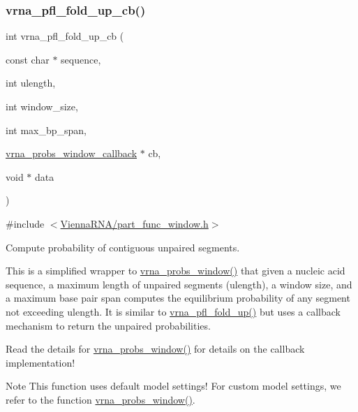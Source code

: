 \subsubsection{\texorpdfstring{vrna\+\_\+pfl\+\_\+fold\+\_\+up\+\_\+cb()}{vrna\_pfl\_fold\_up\_cb()}}
{\footnotesize\ttfamily int vrna\+\_\+pfl\+\_\+fold\+\_\+up\+\_\+cb (\begin{DoxyParamCaption}\item[{const char $\ast$}]{sequence,  }\item[{int}]{ulength,  }\item[{int}]{window\+\_\+size,  }\item[{int}]{max\+\_\+bp\+\_\+span,  }\item[{\hyperlink{group__part__func__window_gabe710a1182e6db69cc75329dfc9bed67}{vrna\+\_\+probs\+\_\+window\+\_\+callback} $\ast$}]{cb,  }\item[{void $\ast$}]{data }\end{DoxyParamCaption})}



{\ttfamily \#include $<$\hyperlink{part__func__window_8h}{Vienna\+R\+N\+A/part\+\_\+func\+\_\+window.\+h}$>$}



Compute probability of contiguous unpaired segments. 

This is a simplified wrapper to \hyperlink{group__part__func__window_ga7115d012988541a65ec323c5f17a334b}{vrna\+\_\+probs\+\_\+window()} that given a nucleic acid sequence, a maximum length of unpaired segments ({\ttfamily ulength}), a window size, and a maximum base pair span computes the equilibrium probability of any segment not exceeding {\ttfamily ulength}. It is similar to \hyperlink{group__part__func__window_ga1dd5c51b797c961124912e289bff553a}{vrna\+\_\+pfl\+\_\+fold\+\_\+up()} but uses a callback mechanism to return the unpaired probabilities.

Read the details for \hyperlink{group__part__func__window_ga7115d012988541a65ec323c5f17a334b}{vrna\+\_\+probs\+\_\+window()} for details on the callback implementation!

\begin{DoxyNote}{Note}
This function uses default model settings! For custom model settings, we refer to the function \hyperlink{group__part__func__window_ga7115d012988541a65ec323c5f17a334b}{vrna\+\_\+probs\+\_\+window()}.
\end{DoxyNote}


